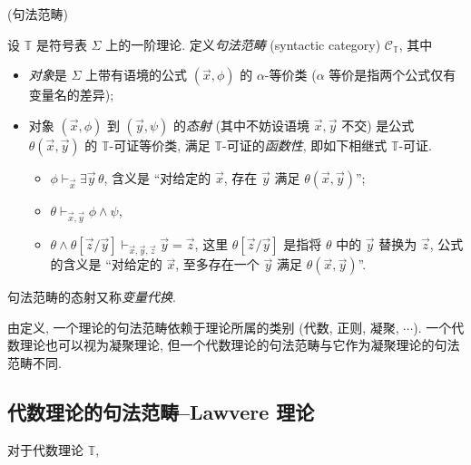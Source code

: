 



\begin{definition}
	{(句法范畴)}
	
	设 $\mathbb T$ 是符号表 $\Sigma$ 上的一阶理论. 定义\emph{句法范畴} (syntactic category) $\mathcal C_{\mathbb T}$, 其中
	\begin{itemize}
		\item \emph{对象}是 $\Sigma$ 上带有语境的公式 $(\vec x , \phi)$ 的 $\alpha$-等价类 ($\alpha$ 等价是指两个公式仅有变量名的差异);
		\item 对象 $(\vec x , \phi)$ 到 $(\vec y , \psi)$ 的\emph{态射} (其中不妨设语境 $\vec x , \vec y$ 不交) 是公式 $\theta(\vec x,\vec y)$ 的 $\mathbb T$-可证等价类, 满足 $\mathbb T$-可证的\emph{函数性}, 即如下相继式 $\mathbb T$-可证.
		\begin{itemize}
			\item $\phi\vdash_{\vec x} \exists \vec y \,\theta$, 含义是 ``对给定的 $\vec x$, 存在 $\vec y$ 满足 $\theta(\vec x,\vec y)$'';
			\item $\theta\vdash_{\vec x,\vec y} \phi \wedge \psi$,
			\item $\theta \wedge \theta[\vec z/\vec y] \vdash_{\vec x,\vec y,\vec z} \vec y = \vec z$, 这里 $\theta[\vec z / \vec y]$ 是指将 $\theta$ 中的 $\vec y$ 替换为 $\vec z$, 公式的含义是 ``对给定的 $\vec x$, 至多存在一个 $\vec y$ 满足 $\theta(\vec x,\vec y)$''.
		\end{itemize}
	\end{itemize}
\end{definition}

\begin{remark}
	{}
	句法范畴的态射又称\emph{变量代换}.
\end{remark}

\begin{remark}
	{}
	由定义, 一个理论的句法范畴依赖于理论所属的类别 (代数, 正则, 凝聚, $\cdots$). 一个代数理论也可以视为凝聚理论, 但一个代数理论的句法范畴与它作为凝聚理论的句法范畴不同.
\end{remark}

\subsection{代数理论的句法范畴--Lawvere 理论}


\begin{prop}
	{}
	对于代数理论 $\mathbb T$,
\end{prop}
